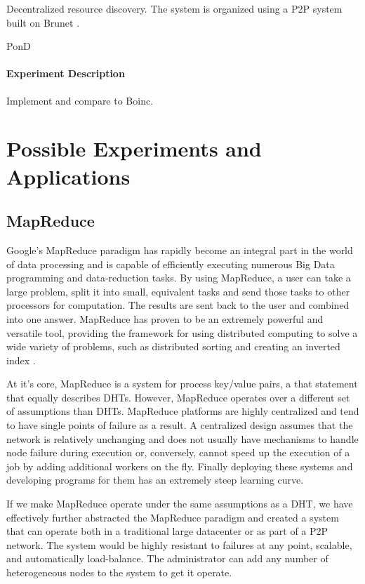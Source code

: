 \documentclass[10pt,letterpaper,twoside]{report}
\begin{document}
Decentralized resource discovery.
The system is organized using a P2P system built on Brunet \cite{brunet}.



PonD \cite{leepond}
\subsubsection{Experiment Description}
Implement and compare to Boinc.



\chapter{Possible Experiments and Applications}


\section{MapReduce}

Google's MapReduce \cite{mapreduce} paradigm has rapidly become an integral part in the world of data processing and is capable of efficiently executing numerous Big Data programming and data-reduction tasks.  
By using MapReduce, a user can take a large problem, split it into small, equivalent tasks and send those tasks to other processors for computation.  
The results are sent back to the user and combined into one answer.  
MapReduce has proven to be an extremely powerful and versatile tool, providing the framework for using distributed computing to solve a wide variety of problems, such as distributed sorting and creating an inverted index \cite{mapreduce}. 

At it's core, MapReduce \cite{mapreduce} is a system for process key/value pairs, a that statement that equally describes DHTs.
However, MapReduce operates over a different set of assumptions \cite{hadoopAssumptions} than DHTs.
MapReduce platforms are highly centralized and tend to have single points of failure\cite{shvachko2010hadoop} as a result.   
A centralized design assumes that the network is relatively unchanging and does not usually have mechanisms to handle node failure during execution or, conversely, cannot speed up the execution of a job by adding additional workers on the fly.
Finally deploying these systems and developing programs for them has an extremely steep learning curve.

If we make MapReduce operate under the same assumptions as a DHT, we have effectively further abstracted the MapReduce paradigm and created a system that can operate both in a traditional large datacenter or as part of a P2P network.
The system would be highly resistant to failures at any point, scalable, and automatically load-balance. 
The administrator can add any number of heterogeneous nodes to the system to get it operate.
\end{document}
